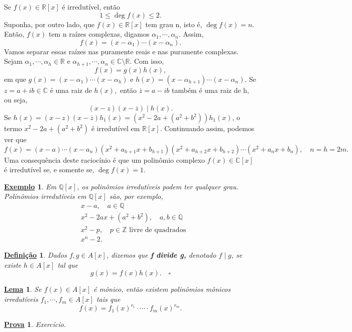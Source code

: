 \documentclass{article}
\newtheorem*{def*}{\underline{Defini\c c\~ao}}
\newtheorem*{lemma*}{\underline{Lema}}
\newtheorem{example}{\underline{Exemplo}}
\newtheorem*{proof*}{\underline{Prova}}
\begin{document}
Se \(f(x)\in \mathbb{R}[x]\) é irredutível, então 
\[
  1\leq \deg{f(x)}\leq 2.
\]
Suponha, por outro lado, que \(f(x)\in \mathbb{R}[x]\) tem grau n, isto é, \(\deg{f(x)} = n.\) Então, \(f(x)\) tem n raízes complexas,
digamos \(\alpha_{1}, \cdots, \alpha_{n}\). Assim, 
\[
  f(x) = (x-\alpha_{1})\cdots(x-\alpha_{n}).
\]
Vamos separar essas raízes nas puramente reais e nas puramente complexas. Sejam \(\alpha_{1}, \cdots, \alpha_{h}\in \mathbb{R}\) e
\(\alpha_{h+1}, \cdots, \alpha_{n}\in \mathbb{C}\setminus{\mathbb{R}}.\) Com isso, 
\[
  f(x) = g(x)h(x),
\]
em que \(g(x) = (x-\alpha_{1})\cdots(x-\alpha_{h})\) e \(h(x) = (x-\alpha_{h+1})\cdots(x-\alpha_{n}).\)
Se \(z = a + ib\in \mathbb{C}\) é uma raiz de \(h(x),\) então \(\overline{z} = a - ib\) também é uma raiz de h, ou seja, 
\[
  (x-z)(x-\overline{z})\mid h(x).
\]
Se \(h(x) = (x-z)(x-\overline{z})h_{1}(x) = (x^{2}-2a + (a^{2}+b^{2}))h_{1}(x)\), o termo 
\(x^{2}-2a + (a^{2}+b^{2})\) é irredutível em \(\mathbb{R}[x]\). Continuando assim, podemos ver que 
\[
  f(x) = (x-a)\cdots(x-a_{n})(x^{2}+a_{h+1}x + b_{h+1})(x^{2}+a_{h+2}x+b_{h+2})\cdots(x^{2}+a_{n}x + b_{n}),\quad n = h = 2m.
\]
Uma consequência deste raciocínio é que um polinômio complexo \(f(x)\in \mathbb{C}[x]\) é irredutível se, e somente se, \(\deg{f(x)} = 1.\)
\begin{example}
  Em \(\mathbb{Q}[x]\), os polinômios irredutíveis podem ter qualquer grau. Polinômios irredutíveis em \(\mathbb{Q}[x]\)
  são, por exemplo, 
  \begin{align*}
  &x-a,\quad a\in \mathbb{Q}\\
  &x^{2}-2ax + (a^{2}+b^{2}),\quad a, b\in \mathbb{Q}\\
  &x^{2} - p,\quad p\in \mathbb{Z}\text{ livre de quadrados}\\
  &x^{n} - 2.
  \end{align*}
\end{example}
\begin{def*}
  Dados \(f, g\in A[x]\), dizemos que \textbf{f divide g,} denotado \(f\mid g\), se existe \(h\in A[x]\) tal que 
  \[
    g(x) = f(x)h(x).\quad\square
  \]
\end{def*}
\begin{lemma*}
  Se \(f(x)\in A[x]\) é mônico, então existem polinômios mônicos irredutíveis \(f_{1}, \cdots, f_{m}\in A[x]\) tais que 
  \[
    f(x) = f_{1}(x)^{r_{1}}\cdot \cdots \cdot f_{m}(x)^{r_{m}}.
  \]
\end{lemma*}
\begin{proof*}
  Exercício.
\end{proof*}
\end{document}
